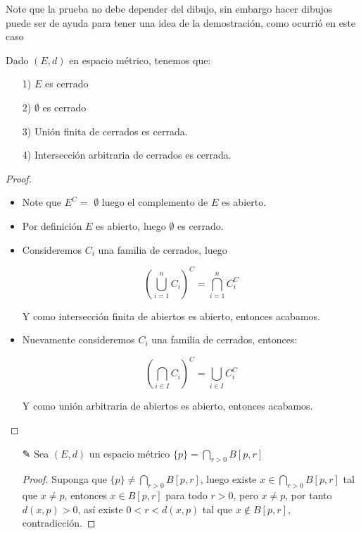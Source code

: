 \begin{itemize}[leftmargin=*]
Note que la prueba no debe depender del dibujo, sin embargo hacer dibujos puede ser de ayuda para tener una idea de la demostración, como ocurrió en este caso

\begin{theorem}[Teorema 9]

Dado $(E,d)$ en espacio métrico, tenemos que:

\begin{itemize}
\item[1)]$E$ es cerrado

\item[2)] $\emptyset$ es cerrado

\item[3)] Unión finita de cerrados es cerrada.

\item[4)]Intersección arbitraria de cerrados es cerrada.

\end{itemize}
\end{theorem}
\vspace*{0.3cm}
\begin{proof}

\begin{itemize}
\item Note que $E^C=$ $\emptyset$ luego el complemento de $E$ es abierto. 

\item Por definición $E$ es abierto, luego $\emptyset$ es cerrado.

\item Consideremos $C_i$ una familia de cerrados, luego

$$\left(\bigcup_{i=1}^n C_i\right)^C=\bigcap_{i=1}^n C_i^C$$

Y como intersección finita de abiertos es abierto, entonces acabamos.

\item Nuevamente consideremos $C_i$ una familia de cerrados, entonces:

$$\left(\bigcap_{i \in I}C_i\right)^C=\bigcup_{i\in I}C_i^C$$

Y como unión arbitraria de abiertos es abierto, entonces acabamos.

\end{itemize}

\end{proof}



\end{itemize}

\begin{itemize}[leftmargin=*]
\item[✎]Sea $(E,d)$ un espacio métrico $\{p\}=\bigcap_{r>0} B[p, r]$\\

\begin{proof}
Suponga que $\{p\}\neq \bigcap_{r>0} B[p, r]$, luego existe $x\in \bigcap_{r>0} B[p, r]$ tal que $x\neq p$, entonces $x \in B[p,r]$ para todo $r>0$, pero $x\neq p$, por tanto $d(x,p)>0$, así existe $0<r<d(x,p)$ tal que $x\not \in B[p,r]$, contradicción.
 \end{proof}
\end{itemize}


